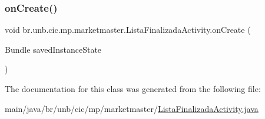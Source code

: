 \subsubsection{\texorpdfstring{on\+Create()}{onCreate()}}
{\footnotesize\ttfamily void br.\+unb.\+cic.\+mp.\+marketmaster.\+Lista\+Finalizada\+Activity.\+on\+Create (\begin{DoxyParamCaption}\item[{Bundle}]{saved\+Instance\+State }\end{DoxyParamCaption})\hspace{0.3cm}{\ttfamily [protected]}}



The documentation for this class was generated from the following file\+:\begin{DoxyCompactItemize}
\item 
main/java/br/unb/cic/mp/marketmaster/\mbox{\hyperlink{ListaFinalizadaActivity_8java}{Lista\+Finalizada\+Activity.\+java}}\end{DoxyCompactItemize}
